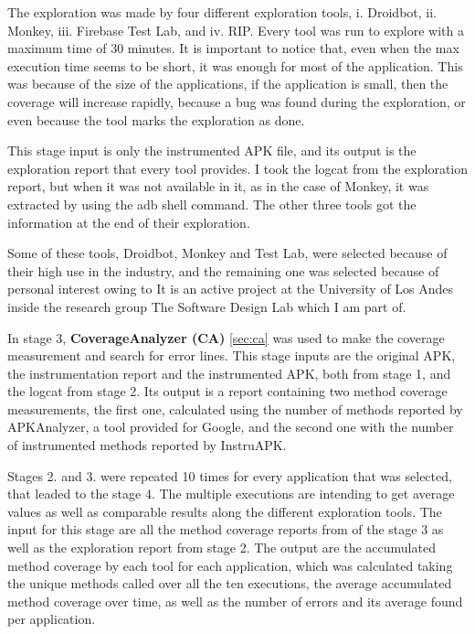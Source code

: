 The exploration was made by four different exploration tools, i. Droidbot, ii. Monkey, iii. Firebase Test Lab, and iv. RIP. Every tool was run to explore with a maximum time of 30 minutes. It is important to notice that, even when the max execution time seems to be short, it was enough for most of the application. This was because of the size of the applications, if the application is small, then the coverage will increase rapidly, because a bug was found during the exploration, or even because the tool marks the exploration as done. 

This stage input is only the instrumented APK file, and its output is the exploration report that every tool provides. I took the logcat from the exploration report, but when it was not available in it, as in the case of Monkey, it was extracted by using the adb shell command. The other three tools got the information at the end of their exploration.
 

Some of these tools, Droidbot, Monkey and Test Lab, were selected because of their high use in the industry, and the remaining one was selected because of personal interest owing to It is an active project at the University of Los Andes inside the research group The Software Design Lab which I am part of. 

In stage 3, \textbf{CoverageAnalyzer (CA)} \ref{sec:ca} was used to make the coverage measurement and search for error lines. This stage inputs are the original APK, the instrumentation report and the instrumented APK, both from stage 1, and the logcat from stage 2. Its output is a report containing two method coverage measurements, the first one, calculated using the number of methods reported by APKAnalyzer, a tool provided for Google, and the second one with the number of instrumented methods reported by InstruAPK.


Stages 2. and 3. were repeated 10 times for every application that was selected, that leaded to the stage 4. The multiple executions are intending to get average values as well as comparable results along the different exploration tools. The input for this stage are all the method coverage reports from of the stage 3 as well as the exploration report from stage 2. The output are the accumulated method coverage by each tool for each application, which was calculated taking the unique methods called over all the ten executions, the average accumulated method coverage over time, as well as the number of errors and its average found per application.

